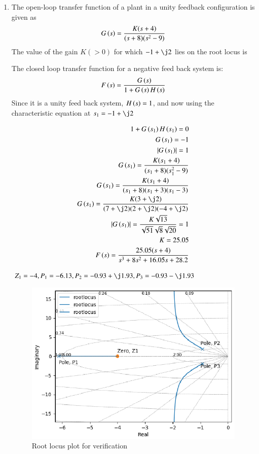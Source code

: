 \begin{enumerate}[label=\thesection.\arabic*.,ref=\thesection.\theenumi]

\item
 The open-loop transfer function of a plant in a unity feedback configuration is given as 
\begin{equation}
    G\left(s\right) = \frac{K(s+4)}{(s+8)(s^{2}-9)}
\end{equation}
 The value of the gain $K(>0)$ for which $-1 + \j2$ lies on the root locus is


\solution
  The closed loop transfer function for a negative feed back system is:
  \begin{equation}
      F\left(s\right) = \frac{G\left(s\right)}{1+G\left(s\right)H\left(s\right)}
  \end{equation}
Since it is a unity feed back system, $H\left(s\right) = 1$, and now using the characteristic equation at $s_{1} = -1 + \j2$

\begin{align}
    1 + G\brak{s_{1}}H\brak{s_{1}} = 0 
\\
    G\brak{s_{1}} = -1 
\\
    \abs{G\brak{s_{1}}} = 1 
\\
    G\brak{s_{1}} = \frac{K(s_{1}+4)}{(s_{1}+8)(s_{1}^{2}-9)} 
\\
    G\brak{s_{1}} = \frac{K(s_{1}+4)}{(s_{1}+8)(s_{1}+3)(s_{1}-3)} 
\\
    G\brak{s_{1}} = \frac{K(3+\j2)}{(7+\j2)(2+\j2)(-4+\j2)} 
\\
    \abs{G\brak{s_{1}}} = \frac{K\sqrt{13}}{\sqrt{51}\sqrt{8}\sqrt{20}} = 1 
\\
    K = 25.05
\\
    F\brak{s} = \frac{25.05(s+4)}{s^{3}+8s^{2}+16.05s+28.2} 
\\
\end{align}

$Z_{1}=-4, P_{1}=-6.13, P_{2}=-0.93+\j1.93, P_{3}=-0.93-\j1.93$


\begin{figure}
\centering
\includegraphics[width=\columnwidth]{figs/ee18btech11052.eps}
\caption{Root locus plot for verification}
\end{figure}



\end{enumerate}
